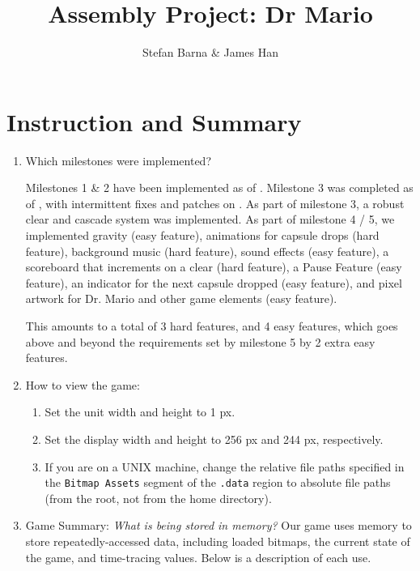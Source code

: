 \documentclass{article}
\title{Assembly Project: Dr Mario}
\author{Stefan Barna \& James Han}
\begin{document}
\maketitle
\section{Instruction and Summary}
\begin{enumerate}
\item Which milestones were implemented?

Milestones 1 \& 2 have been implemented as of \yyyymmdddate{\today}. Milestone 3 was completed as of , with intermittent fixes and patches on \yyyymmdddate{\today}. As part of milestone 3, a robust clear and cascade system was implemented. As part of milestone 4 / 5, we implemented gravity (easy feature), animations for capsule drops (hard feature), background music (hard feature), sound effects (easy feature), a scoreboard that increments on a clear (hard feature), a Pause Feature (easy feature), an indicator for the next capsule dropped (easy feature), and pixel artwork for Dr. Mario and other game elements (easy feature).

This amounts to a total of 3 hard features, and 4 easy features, which goes above and beyond the requirements set by milestone 5 by 2 extra easy features.

\item How to view the game:
\begin{enumerate}
\item Set the unit width and height to 1 px.
\item Set the display width and height to 256 px and 244 px, respectively.
\item If you are on a UNIX machine, change the relative file paths specified in the \verb|Bitmap Assets| segment of the \verb|.data| region to absolute file paths (from the root, not from the home directory).
\end{enumerate}

\item Game Summary:
\textit{What is being stored in memory?} Our game uses memory to store repeatedly-accessed data, including loaded bitmaps, the current state of the game, and time-tracing values. Below is a description of each use.


\end{enumerate}
\end{document}
